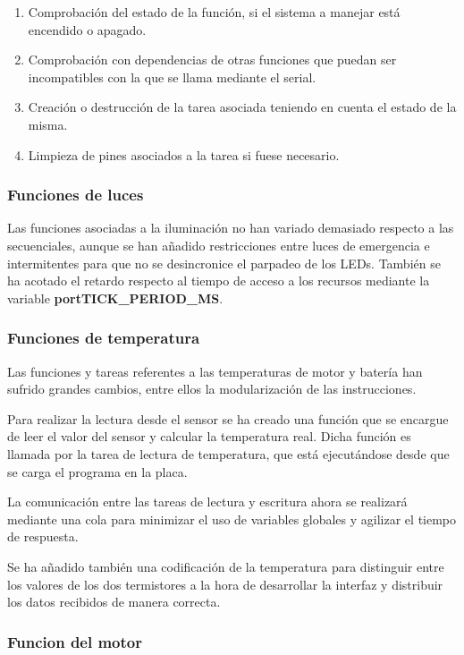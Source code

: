 \begin{enumerate}
    \item Comprobación del estado de la función, si el sistema a manejar está encendido o apagado.
    \item Comprobación con dependencias de otras funciones que puedan ser incompatibles con la que se llama mediante el serial.
    \item Creación o destrucción de la tarea asociada teniendo en cuenta el estado de la misma. 
    \item Limpieza de pines asociados a la tarea si fuese necesario. 
\end{enumerate}



\subsubsection{Funciones de luces}

Las funciones asociadas a la iluminación no han variado demasiado respecto a las secuenciales, aunque se han añadido restricciones entre luces de emergencia e intermitentes para que no se desincronice el parpadeo de los LEDs. También se ha acotado el retardo respecto al tiempo de acceso a los recursos mediante la variable \textbf{portTICK\_PERIOD\_MS}.

\subsubsection{Funciones de temperatura}

Las funciones y tareas referentes a las temperaturas de motor y batería han sufrido grandes cambios, entre ellos la modularización de las instrucciones.

Para realizar la lectura desde el sensor se ha creado una función que se encargue de leer el valor del sensor y calcular la temperatura real. Dicha función es llamada por la tarea de lectura de temperatura, que está ejecutándose desde que se carga el programa en la placa. 

La comunicación entre las tareas de lectura y escritura ahora se realizará mediante una cola para minimizar el uso de variables globales y agilizar el tiempo de respuesta. 

Se ha añadido también una codificación de la temperatura para distinguir entre los valores de los dos termistores a la hora de desarrollar la interfaz y distribuir los datos recibidos de manera correcta.

\subsubsection{Funcion del motor}


